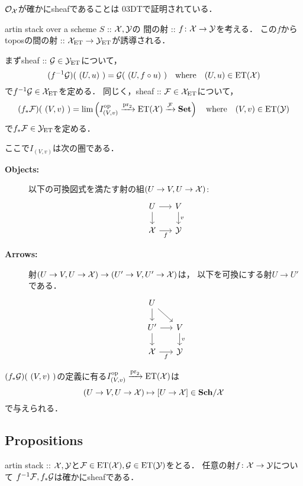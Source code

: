 $\mathcal{O}_{\mathcal{X}}$が確かにsheafであることは\cite{SP} 03DTで証明されている．

\begin{Def}[ $u^{p}, {}_p u$ in \cite{SP} 00VC, 00XF ]
    artin stack over a scheme $S$ :: $\mathcal{X}, \mathcal{Y}$の
    間の射 :: $f \colon \mathcal{X} \to \mathcal{Y}$を考える．
    この$f$からtoposの間の射 :: $\mathcal{X}_{\mathrm{ET}} \to \mathcal{Y}_{\mathrm{ET}}$が誘導される．

    まずsheaf :: $\mathcal{G} \in \mathcal{Y}_{\mathrm{ET}}$について，
    \[ (f^{-1} \mathcal{G})(\ (U, u)\ )=\mathcal{G}(\ (U, f \circ u)\ ) \quad\text{where}\quad (U, u) \in \mathrm{ET}(\mathcal{X}) \]
    で$f^{-1}\mathcal{G} \in \mathcal{X}_{\mathrm{ET}}$を定める．
    同じく，sheaf :: $\mathcal{F} \in \mathcal{X}_{\mathrm{ET}}$について，
    \[
        (f_*\mathcal{F})(\ (V, v)\ )=\operatorname*{lim} \left( I_{(V,v)}^{\mathrm{op}} \xrightarrow{\operatorname{pr}_2} \mathrm{ET}(\mathcal{X}) \xrightarrow{\mathcal{F}} \mathbf{Set} \right)
        \quad\text{where}\quad (V, v) \in \mathrm{ET}(\mathcal{Y})
    \]
    で$f_*\mathcal{F} \in \mathcal{Y}_{\mathrm{ET}}$を定める．
    
    ここで$I_{(V,v)}$は次の圏である．
    \begin{description}
        \item[\textbf{ Objects: }] 
        以下の可換図式を満たす射の組$(U \to V, U \to \mathcal{X})$:
        \[
        \begin{tikzcd}[sep=15pt]
            U \ar[r]\ar[d]& V \ar[d, "v"]\\
            \stX \ar[r, "f"']& \stY
        \end{tikzcd}
        \]

        \item[\textbf{ Arrows: }] 
        射$(U \to V,U \to \mathcal{X}) \to (U' \to V,U' \to \mathcal{X})$は，
        以下を可換にする射$U \to U'$である．
        \[
        \begin{tikzcd}[sep=15pt]
            U \ar[rd]\ar[d]& {} \\
            U' \ar[r]\ar[d]& V \ar[d, "v"]\\
            \stX \ar[r, "f"']& \stY
        \end{tikzcd}
        \]
    \end{description}
    $(f_*\shG)(\ (V, v)\ )$の定義に有る$I_{(V,v)}^{\mathrm{op}} \xrightarrow{\operatorname{pr}_2} \mathrm{ET}(\mathcal{X})$は
    \[ (U \to V, U \to \mathcal{X}) \mapsto [U \to \mathcal{X}] \in \mathbf{Sch}/\mathcal{X} \]
    で与えられる．
\end{Def}

\subsection{Propositions}
\begin{Lemma}[\cite{SP} 06NW]
    artin stack :: $\mathcal{X}, \mathcal{Y}$と$\mathcal{F} \in \mathrm{ET}(\mathcal{X}), \mathcal{G} \in \mathrm{ET}(\mathcal{Y})$をとる．
    任意の射$f \colon \mathcal{X} \to \mathcal{Y}$について
    $f^{-1}\mathcal{F}, f_*\mathcal{G}$は確かにsheafである．
\end{Lemma}

